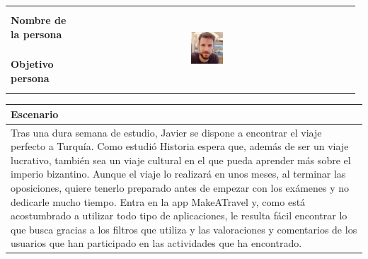 \documentclass[11pt]{article}
\begin{document}
\begin{table}[H]
  \centering
  \begin{tabular}{p{0.2\linewidth}|p{0.3\linewidth}p{0.475\linewidth}}
    \toprule
    \textbf{Nombre de la persona} &  &\multirow{2}{*}{\begin{minipage}{1.\textwidth}\includegraphics[width=0.2\textwidth, height=30mm]{Javier}\end{minipage}}\\
    \textbf{Objetivo persona} &  & \\
    \bottomrule
  \end{tabular}

\begin{tabular}{p{1.028\linewidth}}
  \textbf{Escenario}\\
  \midrule
  Tras una dura semana de estudio, Javier se dispone a encontrar el viaje perfecto a Turquía. Como estudió Historia espera que, además de ser un viaje lucrativo, también sea un viaje cultural en el que pueda aprender más sobre el imperio bizantino. Aunque el viaje lo realizará en unos meses, al terminar las oposiciones, quiere tenerlo preparado antes de empezar con los exámenes y no dedicarle mucho tiempo. Entra en la app MakeATravel y, como está acostumbrado a utilizar todo tipo de aplicaciones, le resulta fácil encontrar lo que busca gracias a los filtros que utiliza y las valoraciones y comentarios de los usuarios que han participado en las actividades que ha encontrado.
\end{tabular}
\end{table}
\end{document}
